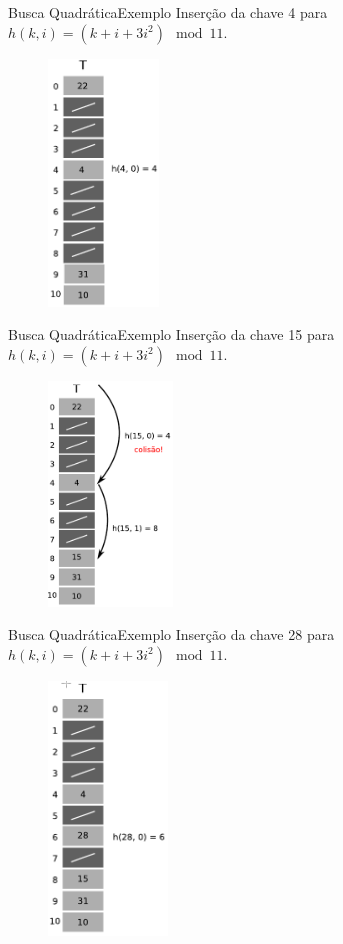 \documentclass[aspectratio=169]{beamer}
\begin{document}
\begin{frame}{Busca Quadrática}{Exemplo}
Inserção da chave 4 para $h(k, i) = (k + i + 3i^2 ) \mod 11$.
\begin{figure}[!h]
  \centering
  \includegraphics[width=83pt]{imagens/ex_end_aberto_quadratico5.png}
  \label{fig_ex_end_aberto_quadratico5}
\end{figure}
\end{frame}

\begin{frame}{Busca Quadrática}{Exemplo}
Inserção da chave 15 para $h(k, i) = (k + i + 3i^2 ) \mod 11$.
\begin{figure}[!h]
  \centering
  \includegraphics[width=94pt]{imagens/ex_end_aberto_quadratico6.png}
  \label{fig_ex_end_aberto_quadratico6}
\end{figure}
\end{frame}

\begin{frame}{Busca Quadrática}{Exemplo}
Inserção da chave 28 para $h(k, i) = (k + i + 3i^2 ) \mod 11$.
\begin{figure}[!h]
  \centering
  \includegraphics[width=90pt]{imagens/ex_end_aberto_quadratico7.png}
  \label{fig_ex_end_aberto_quadratico7}
\end{figure}
\end{frame}
\end{document}

